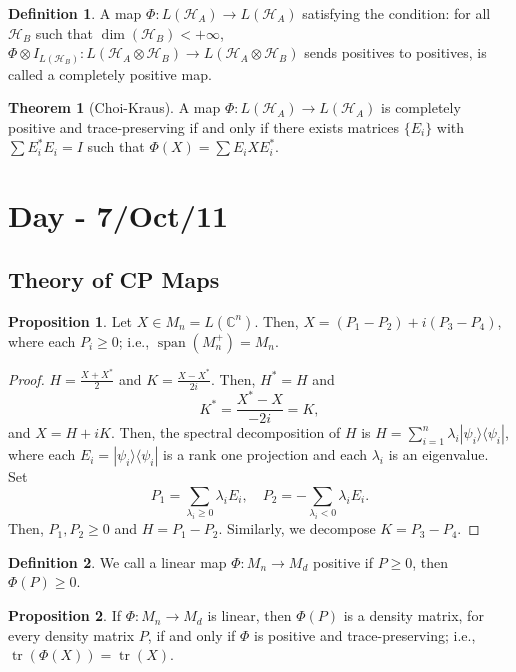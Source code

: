 \documentclass[12pt]{article}
\theoremstyle{definition}
\newtheorem*{theorem}{Theorem}
\newtheorem*{proposition}{Proposition}
\newtheorem*{definition}{Definition}
\newcommand{\ketbra}[2]{|#1\rangle\langle #2|}
\DeclareMathOperator{\tr}{tr}
\newcommand{\C}{\mathbb{C}}
\begin{document}
\begin{definition}
A map $\Phi:L(\mathcal{H}_A)\to L(\mathcal{H}_A)$ satisfying the condition: for all $\mathcal{H}_B$ such that $\dim(\mathcal{H}_B)<+\infty$, $\Phi \otimes I_{L(\mathcal{H}_B)}:L(\mathcal{H}_A \otimes \mathcal{H}_B) \to L(\mathcal{H}_A \otimes \mathcal{H}_B)$ sends positives to positives, is called a completely positive map.
\end{definition}

\begin{theorem}[Choi-Kraus]
A map $\Phi:L(\mathcal{H}_A)\to L(\mathcal{H}_A)$ is completely positive and trace-preserving if and only if there exists matrices $\{E_i\}$ with $\sum E_i^*E_i=I$ such that $\Phi(X)=\sum E_iXE_i^*$.
\end{theorem}

\section{Day - 7/Oct/11}

\subsection{Theory of CP Maps}

\begin{proposition}
Let $X \in M_n = L(\C^n)$. Then, $X = (P_1-P_2)+i(P_3-P_4)$, where each $P_i \geq 0$; i.e., $\operatorname{span}(M_n^+) = M_n$.
\end{proposition}

\begin{proof}
$H=\frac{X+X^*}{2}$ and $K=\frac{X-X^*}{2i}$. Then, $H^*=H$ and
\[
K^*=\frac{X^*-X}{-2i}=K,
\]
and $X=H+iK$. Then, the spectral decomposition of $H$ is $H=\sum_{i=1}^n \lambda_i \ketbra{\psi_i}{\psi_i}$, where each $E_i=\ketbra{\psi_i}{\psi_i}$ is a rank one projection and each $\lambda_i$ is an eigenvalue. Set
\[
P_1 = \sum_{\lambda_i \geq 0} \lambda_i E_i, \quad P_2 = -\sum_{\lambda_i < 0} \lambda_i E_i.
\]
Then, $P_1,P_2 \geq 0$ and $H=P_1-P_2$. Similarly, we decompose $K=P_3-P_4$.
\end{proof}

\begin{definition}
We call a linear map $\Phi:M_n \to M_d$ positive if $P \geq 0$, then $\Phi(P) \geq 0$.
\end{definition}

\begin{proposition}
If $\Phi:M_n \to M_d$ is linear, then $\Phi(P)$ is a density matrix, for every density matrix $P$, if and only if $\Phi$ is positive and trace-preserving; i.e., $\tr(\Phi(X))=\tr(X)$.
\end{proposition}
\end{document}
